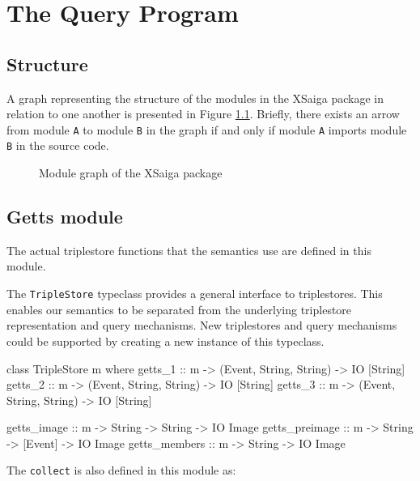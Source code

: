 \documentclass[../main.tex]{subfiles}
\begin{document}
\chapter{The Query Program}

\section{Structure}

A graph representing the structure of the modules in the XSaiga package in relation to one another is presented in Figure \ref{fig:modulegraph}.  Briefly, there exists an arrow from module \texttt{A} to module \texttt{B} in the graph if and only if module \texttt{A} imports module \texttt{B} in the source code.

\begin{figure}[h]
	\centering
	\caption{Module graph of the XSaiga package}
	\label{fig:modulegraph}
\end{figure}

\section{Getts module}
	The actual triplestore functions that the semantics use are defined in this module.
	
	The \texttt{TripleStore} typeclass provides a general interface to triplestores.  This enables our semantics to be separated from
	the underlying triplestore representation and query mechanisms.  New triplestores and query mechanisms could be supported by creating
	a new instance of this typeclass.
	
	\begin{code}
		class TripleStore m where
		getts_1 :: m -> (Event, String, String) -> IO [String]
		getts_2 :: m -> (Event, String, String) -> IO [String]
		getts_3 :: m -> (Event, String, String) -> IO [String]

		getts_image :: m -> String -> String -> IO Image
		getts_preimage :: m -> String -> [Event] -> IO Image
		getts_members :: m -> String -> IO Image
	\end{code}

	The \texttt{collect} is also defined in this module as:

	
\end{document}

